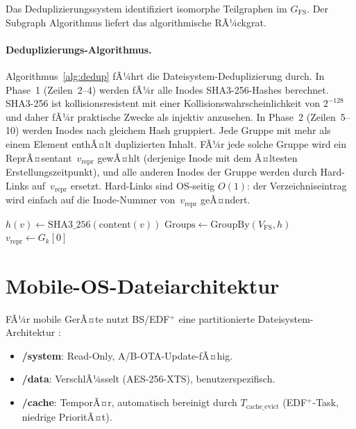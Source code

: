 ﻿\documentclass[a4paper,12pt]{scrreprt}
\theoremstyle{definition}
\begin{document}
	Das Deduplizierungssystem \cite{Epp2026dusgraph} identifiziert
	isomorphe Teilgraphen im $G_{\mathrm{FS}}$. Der Subgraph Algorithmus
	\cite{Epp2026subgraph} liefert das algorithmische RÃ¼ckgrat.

	\paragraph{Deduplizierungs-Algorithmus.}
	Algorithmus~\ref{alg:dedup} fÃ¼hrt die Dateisystem-Deduplizierung durch.
	In Phase~1 (Zeilen~2--4) werden fÃ¼r alle Inodes SHA3-256-Hashes berechnet.
	SHA3-256 ist kollisionsresistent mit einer Kollisionswahrscheinlichkeit
	von $2^{-128}$ und daher fÃ¼r praktische Zwecke als injektiv anzusehen.
	In Phase~2 (Zeilen~5--10) werden Inodes nach gleichem Hash gruppiert.
	Jede Gruppe mit mehr als einem Element enthÃ¤lt duplizierten Inhalt.
	FÃ¼r jede solche Gruppe wird ein ReprÃ¤sentant~$v_{\mathrm{repr}}$ gewÃ¤hlt
	(derjenige Inode mit dem Ã¤ltesten Erstellungszeitpunkt), und alle anderen
	Inodes der Gruppe werden durch Hard-Links auf~$v_{\mathrm{repr}}$ ersetzt.
	Hard-Links sind OS-seitig $O(1)$: der Verzeichniseintrag wird einfach
	auf die Inode-Nummer von~$v_{\mathrm{repr}}$ geÃ¤ndert.

	\begin{algorithm}[H]
		\caption{Dateisystem-Deduplizierung}
		\label{alg:dedup}
		\begin{algorithmic}[1]
			\State $h(v) \gets \mathrm{SHA3\_256}(\mathrm{content}(v))$
			\EndFor
			\State $\mathrm{Groups} \gets \mathrm{GroupBy}(V_{\mathrm{FS}}, h)$
			\State $v_{\mathrm{repr}} \gets G_k[0]$
			\State {}
			\EndFor
			\EndFor
			\EndProcedure
		\end{algorithmic}
	\end{algorithm}
	
	\section{Mobile-OS-Dateiarchitektur}
	
	FÃ¼r mobile GerÃ¤te nutzt BS/EDF$^+$ eine partitionierte Dateisystem-Architektur
	\cite{Epp2026mobde}:
	\begin{itemize}
		\item \textbf{/system}: Read-Only, A/B-OTA-Update-fÃ¤hig.
		\item \textbf{/data}: VerschlÃ¼sselt (AES-256-XTS), benutzerspezifisch.
		\item \textbf{/cache}: TemporÃ¤r, automatisch bereinigt durch
		$T_{\mathrm{cache\_evict}}$ (EDF$^+$-Task, nie\-drige PrioritÃ¤t).
	\end{itemize}
	
\end{document}
